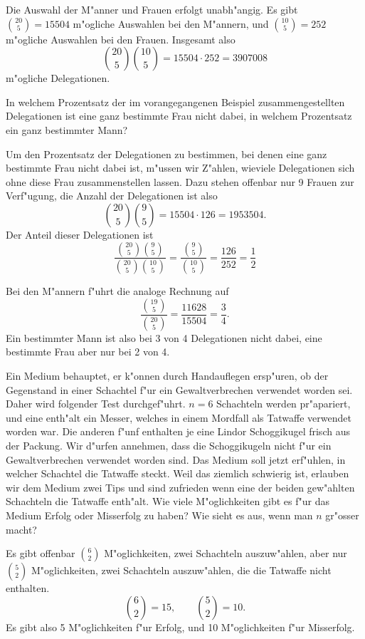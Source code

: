 \begin{beispiele}
\begin{loesung}
Die Auswahl der M"anner und Frauen erfolgt unabh"angig.
Es gibt
$\binom{20}{5}=15504$ m"ogliche Auswahlen bei den M"annern,
und $\binom{10}{5}=252$ m"ogliche Auswahlen bei den Frauen.
Insgesamt also
\[
\binom{20}{5}\binom{10}{5}=15504\cdot 252 = 3907008
\]
m"ogliche Delegationen.
\end{loesung}

\item In welchem Prozentsatz der im vorangegangenen Beispiel
zusammengestellten Delegationen ist eine ganz bestimmte Frau
nicht dabei, in welchem Prozentsatz ein ganz bestimmter Mann?

\begin{loesung}
Um den Prozentsatz der Delegationen zu bestimmen, bei denen
eine ganz bestimmte Frau nicht dabei ist, m"ussen wir Z"ahlen,
wieviele Delegationen sich ohne diese Frau zusammenstellen 
lassen.
Dazu stehen offenbar nur 9 Frauen zur Verf"ugung, die 
Anzahl der Delegationen ist also
\[
\binom{20}{5}\binom{9}{5}=15504\cdot 126 = 1953504.
\]
Der Anteil dieser Delegationen ist
\[
\frac{
\binom{20}{5}\binom{9}{5}
}{
\binom{20}{5}\binom{10}{5}
}
=
\frac{ \binom{9}{5} }{ \binom{10}{5} }
=
\frac{126}{252}=\frac12
\]
\end{loesung}
Bei den M"annern f"uhrt die analoge Rechnung auf
\[
\frac{\binom{19}{5}}{\binom{20}{5}}=\frac{11628}{15504}=\frac34.
\]
Ein bestimmter Mann ist also bei 3 von 4 Delegationen nicht dabei,
eine bestimmte Frau aber nur bei 2 von 4.
\item Ein Medium behauptet, er k"onnen durch Handauflegen ersp"uren, ob
der Gegenstand in einer Schachtel f"ur ein Gewaltverbrechen verwendet
worden sei.
Daher wird folgender Test durchgef"uhrt.
$n=6$
Schachteln werden pr"apariert, und eine enth"alt ein Messer,
welches in einem Mordfall als Tatwaffe verwendet worden war.
Die anderen f"unf enthalten je eine Lindor Schoggikugel frisch aus der Packung.
Wir d"urfen annehmen, dass die Schoggikugeln nicht f"ur ein Gewaltverbrechen
verwendet worden sind.
Das Medium soll jetzt erf"uhlen, in welcher
Schachtel die Tatwaffe steckt.
Weil das ziemlich schwierig ist, erlauben
wir dem Medium zwei Tips und sind zufrieden wenn eine der beiden
gew"ahlten Schachteln die Tatwaffe enth"alt.
Wie viele M"oglichkeiten gibt
es f"ur das Medium Erfolg oder Misserfolg zu haben?
Wie sieht es aus, wenn man $n$ gr"osser macht?

\begin{loesung}
Es gibt offenbar $\binom{6}{2}$ M"oglichkeiten, zwei Schachteln auszuw"ahlen,
aber nur $\binom{5}{2}$ M"oglichkeiten, zwei Schachteln auszuw"ahlen,
die die Tatwaffe nicht enthalten.
\[
\binom{6}{2}=15,\qquad\binom{5}{2}=10.
\]
Es gibt also 5 M"oglichkeiten f"ur Erfolg, und 10 M"oglichkeiten
f"ur Misserfolg.


\end{loesung}
\end{beispiele}
